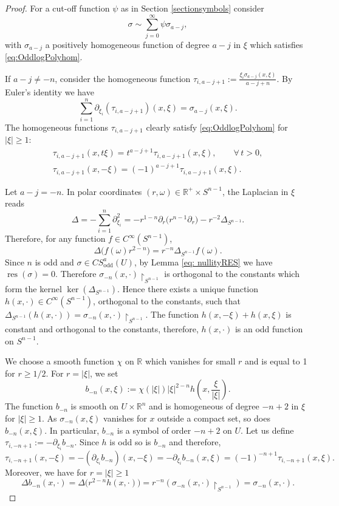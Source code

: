 \documentclass[pdftex]{sigma}
\DeclareMathOperator{\res}{res} \DeclareMathOperator{\Res}{Res}
\DeclareMathOperator{\odd}{odd} \DeclareMathOperator{\supp}{supp}
\begin{document}
\begin{proof}
For a cut-of\/f function $\psi$ as in Section \ref{sectionsymbols} consider
\[
\sigma\sim\sum_{j=0}^\infty\psi \sigma_{a-j},
\]
with $\sigma_{a-j}$ a positively homogeneous function of degree $a-j$ in $\xi$ which satisf\/ies \eqref{eq:OddlogPolyhom}.

 If $a-j\not=-n$, consider the homogeneous function $\tau_{i,a-j+1}:=\frac{\xi_i\sigma_{a-j}(x,\xi)}{a-j+n}$. By Euler's identity we have
\[
\sum_{i=1}^n\partial_{\xi_i}(\tau_{i,a-j+1})(x,\xi)=\sigma_{a-j}(x,\xi).
\]
The homogeneous functions $\tau_{i,a-j+1}$ clearly satisfy \eqref{eq:OddlogPolyhom} for $|\xi|\geq1$:
\begin{gather*}
\tau_{i,a-j+1}(x,t\xi) =t^{a-j+1}\tau_{i,a-j+1}(x,\xi),\qquad \forall\, t>0,\\
\tau_{i,a-j+1}(x,-\xi) =(-1)^{a-j+1}\tau_{i,a-j+1}(x,\xi).
\end{gather*}

 Let $a-j=-n$. In polar coordinates $(r,\omega)\in\mathbb{R}^+\times S^{n-1}$, the Laplacian in $\xi$ reads
\[
\Delta=-\sum_{i=1}^n\partial_{\xi_i}^2=-r^{1-n}\partial_r\big(r^{n-1}\partial_r\big)-r^{-2}\Delta_{S^{n-1}}.
\]
Therefore, for any function $f\in C^\infty(S^{n-1})$,
\[
\Delta\big(f(\omega)r^{2-n}\big)=r^{-n}\Delta_{S^{n-1}}f(\omega).
\]
Since $n$ is odd and $\sigma\in CS_{\odd}^a(U)$, by Lemma \ref{eq: nullityRES} we have $\res(\sigma)=0$. Therefore $\sigma_{-n}(x,\cdot)\upharpoonright_{S^{n-1}}$ is orthogonal to the constants which form the kernel $\ker(\Delta_{S^{n-1}})$. Hence there exists a unique function $h(x,\cdot)\in C^\infty(S^{n-1})$, orthogonal to the constants, such that $\Delta_{S^{n-1}}(h(x,\cdot))=\sigma_{-n}(x,\cdot)\upharpoonright_{S^{n-1}}$. The function $h(x,-\xi)+h(x,\xi)$ is constant and orthogonal to the constants, therefore, $h(x,\cdot)$ is an odd function on $S^{n-1}$.

 We choose a smooth function $\chi$ on $\mathbb{R}$ which vanishes for small $r$ and is equal to 1 for $r\geq1/2$. For $r=|\xi|$, we set
\[
b_{-n}(x,\xi):=\chi(|\xi|)|\xi|^{2-n}h\left(x,\frac{\xi}{|\xi|}\right).
\]
The function $b_{-n}$ is smooth on $U\times\mathbb{R}^n$ and is homogeneous of degree $-n+2$ in $\xi$ for $|\xi|\geq1$. As $\sigma_{-n}(x,\xi)$ vanishes for $x$ outside a compact set, so does $b_{-n}(x,\xi)$. In particular, $b_{-n}$ is a symbol of order $-n+2$ on $U$. Let us def\/ine $\tau_{i,-n+1}:=-\partial_{\xi_i}b_{-n}$. Since $h$ is odd so is $b_{-n}$ and therefore,
\[
\tau_{i,-n+1}(x,-\xi)=-(\partial_{\xi_i}b_{-n})(x,-\xi)
=-\partial_{\xi_i}b_{-n}(x,\xi)
=(-1)^{-n+1}\tau_{i,-n+1}(x,\xi).
\]
Moreover, we have for $r=|\xi|\geq1$
\[
\Delta b_{-n}(x,\cdot)=\Delta\big(r^{2-n}h(x,\cdot)\big)=r^{-n}\left(\sigma_{-n}(x,\cdot)\upharpoonright_{S^{n-1}}\right)=\sigma_{-n}(x,\cdot).
\]



\end{proof}
\end{document}
